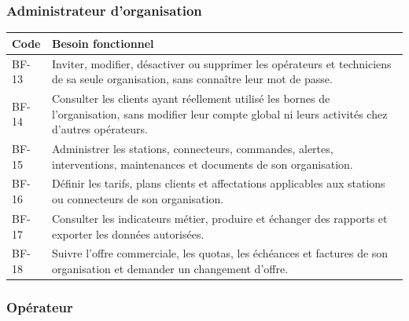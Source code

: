 \subsubsection{Administrateur d'organisation}

\begin{longtable}{|C{1.35cm}|p{12.3cm}|}
  \hline
  \textbf{Code} & \textbf{Besoin fonctionnel}\\
  \hline
  BF-13 & Inviter, modifier, désactiver ou supprimer les opérateurs et techniciens de
  sa seule organisation, sans connaître leur mot de passe.\\\hline
  BF-14 & Consulter les clients ayant réellement utilisé les bornes de l'organisation,
  sans modifier leur compte global ni leurs activités chez d'autres opérateurs.\\\hline
  BF-15 & Administrer les stations, connecteurs, commandes, alertes, interventions,
  maintenances et documents de son organisation.\\\hline
  BF-16 & Définir les tarifs, plans clients et affectations applicables aux stations
  ou connecteurs de son organisation.\\\hline
  BF-17 & Consulter les indicateurs métier, produire et échanger des rapports et
  exporter les données autorisées.\\\hline
  BF-18 & Suivre l'offre commerciale, les quotas, les échéances et factures de son
  organisation et demander un changement d'offre.\\
  \hline
\end{longtable}

\subsubsection{Opérateur}

